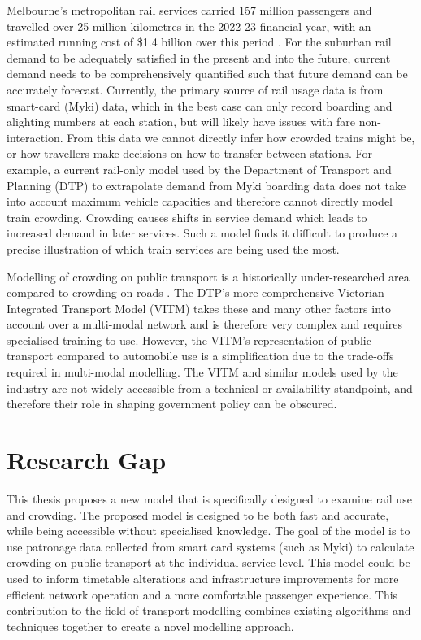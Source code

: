 Melbourne's metropolitan rail services carried 157 million passengers and travelled over 25 million kilometres in the 2022-23 financial year, with an estimated running cost of \$1.4 billion over this period \cite[p.~47]{victoriandepartmentoftransportandplanningDepartmentTransportPlanning2023}. For the suburban rail demand to be adequately satisfied in the present and into the future, current demand needs to be comprehensively quantified such that future demand can be accurately forecast. Currently, the primary source of rail usage data is from smart-card (Myki) data, which in the best case can only record boarding and alighting numbers at each station, but will likely have issues with fare non-interaction. From this data we cannot directly infer how crowded trains might be, or how travellers make decisions on how to transfer between stations. For example, a current rail-only model used by the Department of Transport and Planning (DTP) to extrapolate demand from Myki boarding data does not take into account maximum vehicle capacities and therefore cannot directly model train crowding. Crowding causes shifts in service demand which leads to increased demand in later services. Such a model finds it difficult to produce a precise illustration of which train services are being used the most.

Modelling of crowding on public transport is a historically under-researched area compared to crowding on roads \cite{boumanPassengersCrowdingComplexity2017}. The DTP's more comprehensive Victorian Integrated Transport Model (VITM) takes these and many other factors into account over a multi-modal network and is therefore very complex and requires specialised training to use. However, the VITM's representation of public transport compared to automobile use is a simplification due to the trade-offs required in multi-modal modelling. The VITM and similar models used by the industry are not widely accessible from a technical or availability standpoint, and therefore their role in shaping government policy can be obscured.

\section{Research Gap}
This thesis proposes a new model that is specifically designed to examine rail use and crowding. The proposed model is designed to be both fast and accurate, while being accessible without specialised knowledge. The goal of the model is to use patronage data collected from smart card systems (such as Myki) to calculate crowding on public transport at the individual service level. This model could be used to inform timetable alterations and infrastructure improvements for more efficient network operation and a more comfortable passenger experience. This contribution to the field of transport modelling combines existing algorithms and techniques together to create a novel modelling approach.

